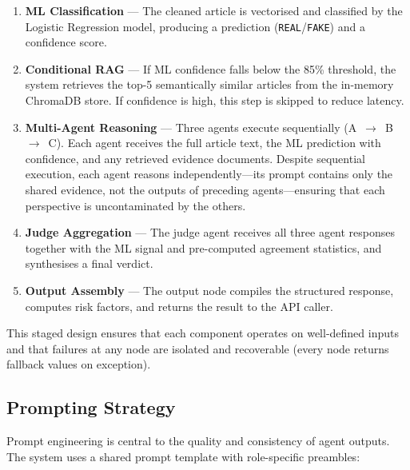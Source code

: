 \documentclass[12pt, a4paper]{article}
\begin{document}
\begin{enumerate}[leftmargin=2em]
    \item \textbf{ML Classification} --- The cleaned article is vectorised
          and classified by the Logistic Regression model, producing a
          prediction (\texttt{REAL}/\texttt{FAKE}) and a confidence score.
    \item \textbf{Conditional RAG} --- If ML confidence falls below the
          85\% threshold, the system retrieves the top-5 semantically
          similar articles from the in-memory ChromaDB store. If confidence
          is high, this step is skipped to reduce latency.
    \item \textbf{Multi-Agent Reasoning} --- Three agents execute
          sequentially (A~$\to$~B~$\to$~C). Each agent receives the full
          article text, the ML prediction with confidence, and any
          retrieved evidence documents. Despite sequential execution, each
          agent reasons independently---its prompt contains only the shared
          evidence, not the outputs of preceding agents---ensuring that
          each perspective is uncontaminated by the others.
    \item \textbf{Judge Aggregation} --- The judge agent receives all
          three agent responses together with the ML signal and
          pre-computed agreement statistics, and synthesises a final
          verdict.
    \item \textbf{Output Assembly} --- The output node compiles the
          structured response, computes risk factors, and returns the
          result to the API caller.
\end{enumerate}

This staged design ensures that each component operates on well-defined
inputs and that failures at any node are isolated and recoverable (every
node returns fallback values on exception).


\subsection{Prompting Strategy}

Prompt engineering is central to the quality and consistency of agent
outputs. The system uses a shared prompt template with role-specific
preambles:
\end{document}
